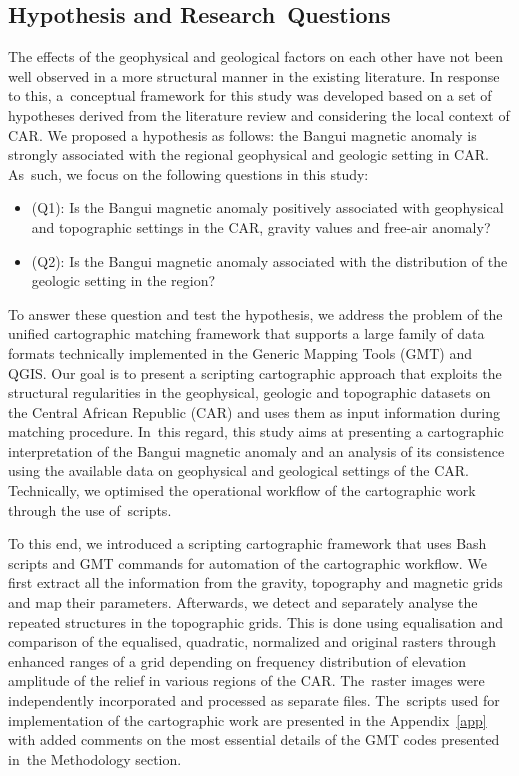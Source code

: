\documentclass[minerals,article,accept,pdftex,moreauthors]{Definitions/mdpi}
\begin{document}
\subsection{Hypothesis and Research~Questions}

{The effects of the geophysical and geological factors on each other have not been well observed in a more structural manner in the existing literature. In response to this, a~conceptual framework for this study was developed based on a set of hypotheses derived from the literature review and considering the local context of CAR. We proposed a hypothesis as follows: the Bangui magnetic anomaly is strongly associated with the regional geophysical and geologic setting in CAR. As~such, we focus on the following questions in this study: }
\begin{itemize}
  \item {(Q1): Is the Bangui magnetic anomaly positively associated with geophysical and topographic settings in the CAR, gravity values and free-air anomaly?} 
  \item {(Q2): Is the Bangui magnetic anomaly associated with the distribution of the geologic setting in the region?}
\end{itemize}

{To answer these question and test the hypothesis, }we address the problem of the unified cartographic matching framework that supports a large family of data formats technically implemented in the Generic Mapping Tools (GMT) and QGIS. Our goal is to present a scripting cartographic approach that exploits the structural regularities in the geophysical, geologic and topographic datasets on the Central African Republic (CAR) and uses them as input information during matching procedure. In~this regard, this study aims at presenting a cartographic interpretation of the Bangui magnetic anomaly and an analysis of its consistence using the available data on geophysical and geological settings of the CAR. Technically, we optimised the operational workflow of the cartographic work through the use of~scripts. 

To this end, we introduced a scripting cartographic framework {that uses Bash scripts and GMT commands for} automation of the cartographic workflow. We first extract all the information from the gravity, topography and magnetic grids and map their parameters. Afterwards, we detect and separately analyse the repeated structures in the topographic grids. This is done using equalisation and comparison of the equalised, quadratic, normalized and original rasters through enhanced  ranges of a grid depending on frequency distribution of elevation amplitude of the relief in various regions of {the} CAR. The~raster images {were independently incorporated and processed} as separate files. The~scripts used for implementation of the cartographic work are presented in the Appendix~\ref{app} with added comments on the most essential details of the GMT codes presented in~the Methodology section. %
\end{document}
